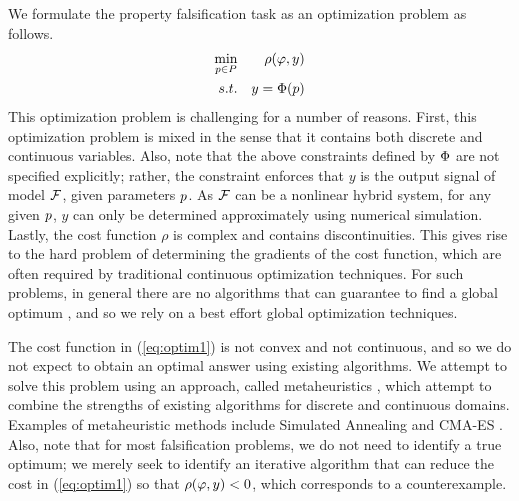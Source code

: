 We formulate the property falsification task as an optimization problem as follows.
\begin{eqnarray} \label{eq:optim1}
\min_{p \in P} && \rho(\varphi,y) \\ \nonumber
s.t. && y=\Phi(p)
\end{eqnarray}
This optimization problem is challenging for a number of reasons. First, this optimization problem is mixed in the sense that it contains both discrete and continuous variables. Also, note that the above constraints defined by $\Phi$ 
are not specified explicitly; rather, the constraint enforces that $y$ is the output signal of model $\mathcal{F}$, given parameters $p$.
As $\mathcal{F}$ can be a nonlinear hybrid system, for any given $p$, $y$ can only be determined approximately using numerical simulation. 
Lastly, the cost function $\rho$ is complex and contains discontinuities.
This gives rise to the hard problem of determining the gradients of the cost function, which are often required by traditional continuous optimization techniques. 
For such problems, in general there are no algorithms that can guarantee to find a global optimum \cite{FloudasPardalos2009}, and so we rely on a best effort global optimization techniques. 

The cost function in (\ref{eq:optim1}) is not convex and not continuous, and so we do not expect to obtain an optimal answer using existing algorithms. We attempt to solve this problem using an approach, called metaheuristics \cite{dreo:hal-01341683}, which attempt to combine the strengths of existing algorithms for discrete and continuous domains. Examples of metaheuristic methods include Simulated Annealing \cite{Kirkpatrick83optimizationby} and CMA-ES \cite{hansen2006eda}. Also, note that for most falsification problems, we do not need to identify a true optimum; we merely seek to identify an iterative algorithm that can reduce the cost in (\ref{eq:optim1}) so that $\rho(\varphi,y)<0$, which corresponds to a counterexample.



